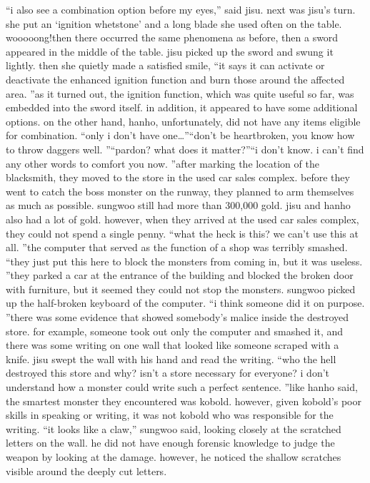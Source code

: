 “i also see a combination option before my eyes,” said jisu.
next was jisu’s turn.
 she put an ‘ignition whetstone’ and a long blade she used often on the table.
wooooong!then there occurred the same phenomena as before, then a sword appeared in the middle of the table.
jisu picked up the sword and swung it lightly.
 then she quietly made a satisfied smile, “it says it can activate or deactivate the enhanced ignition function and burn those around the affected area.
”as it turned out, the ignition function, which was quite useful so far, was embedded into the sword itself.
 in addition, it appeared to have some additional options.
on the other hand, hanho, unfortunately, did not have any items eligible for combination.
“only i don’t have one…”“don’t be heartbroken, you know how to throw daggers well.
”“pardon? what does it matter?”“i don’t know.
 i can’t find any other words to comfort you now.
”after marking the location of the blacksmith, they moved to the store in the used car sales complex.
before they went to catch the boss monster on the runway, they planned to arm themselves as much as possible.
 sungwoo still had more than 300,000 gold.
 jisu and hanho also had a lot of gold.
however, when they arrived at the used car sales complex, they could not spend a single penny.
“what the heck is this? we can’t use this at all.
”the computer that served as the function of a shop was terribly smashed.
“they just put this here to block the monsters from coming in, but it was useless.
”they parked a car at the entrance of the building and blocked the broken door with furniture, but it seemed they could not stop the monsters.
sungwoo picked up the half-broken keyboard of the computer.
“i think someone did it on purpose.
”there was some evidence that showed somebody’s malice inside the destroyed store.
for example, someone took out only the computer and smashed it, and there was some writing on one wall that looked like someone scraped with a knife.
jisu swept the wall with his hand and read the writing.
“who the hell destroyed this store and why? isn’t a store necessary for everyone? i don’t understand how a monster could write such a perfect sentence.
”like hanho said, the smartest monster they encountered was kobold.
 however, given kobold’s poor skills in speaking or writing, it was not kobold who was responsible for the writing.
“it looks like a claw,” sungwoo said, looking closely at the scratched letters on the wall.
he did not have enough forensic knowledge to judge the weapon by looking at the damage.
 however, he noticed the shallow scratches visible around the deeply cut letters.
